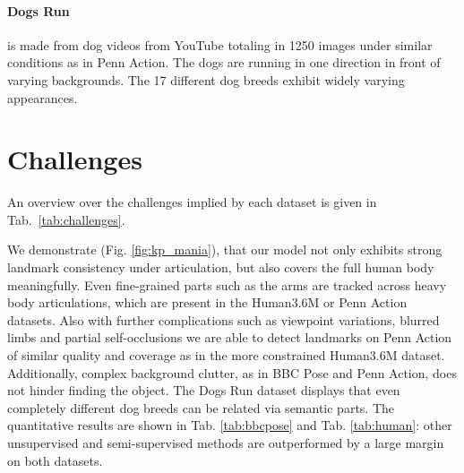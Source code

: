 		\paragraph{Dogs Run} is made from dog videos from YouTube totaling in 1250 images under similar conditions as in Penn Action. The dogs are running in one direction in front of varying backgrounds. The 17 different dog breeds exhibit widely varying appearances.

	\section{Challenges}\label{sec:challenges}
		An overview over the challenges implied by each dataset is given in Tab.~\ref{tab:challenges}.

		We demonstrate (Fig. \ref{fig:kp_mania}), that our model not only exhibits strong landmark consistency under articulation, but also covers the full human body meaningfully.
		Even fine-grained parts such as the arms are tracked across heavy body articulations, which are present in the Human3.6M or Penn Action datasets.
		Also with further complications such as viewpoint variations, blurred limbs and partial self-occlusions we are able to detect landmarks on Penn Action of similar quality and coverage as in the more constrained Human3.6M dataset.
		Additionally, complex background clutter, as in BBC Pose and Penn Action, does not hinder finding the object.
		The Dogs Run dataset displays that even completely different dog breeds can be related via semantic parts.
		The quantitative results are shown in Tab. \ref{tab:bbcpose} and Tab. \ref{tab:human}: other unsupervised and semi-supervised methods are outperformed by a large margin on both datasets.
